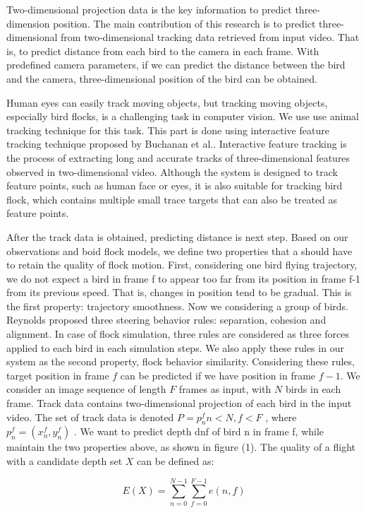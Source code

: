 Two-dimensional projection data is the key information to predict three-dimension position. The main contribution of this research is to predict three-dimensional from two-dimensional tracking data retrieved from input video. That is, to predict distance from each bird to the camera in each frame. With predefined camera parameters, if we can predict the distance between the bird and the camera, three-dimensional position of the bird can be obtained.


Human eyes can easily track moving objects, but tracking moving objects, especially bird flocks, is a challenging task in computer vision. We use use animal tracking technique for this task. This part is done using interactive feature tracking technique proposed by Buchanan et al.\cite{Tracking}. Interactive feature tracking is the process of extracting long and accurate tracks of three-dimensional features observed in two-dimensional video. Although the system is designed to track feature points, such as human face or eyes, it is also suitable for tracking bird flock, which contains multiple small trace targets that can also be treated as feature points.


After the track data is obtained, predicting distance is next step. Based on our observations and boid flock models, we define two properties that a should have to retain the quality of flock motion. First, considering one bird flying trajectory, we do not expect a bird in frame f to appear too far from its position in frame f-1 from its previous speed. That is, changes in position tend to be gradual. This is the first property: trajectory smoothness. Now we considering a group of birds. Reynolds proposed three steering behavior rules: separation, cohesion and alignment\cite{Boid}. In case of flock simulation, three rules are considered as three forces applied to each bird in each simulation steps. We also apply these rules in our system as the second property, flock behavior similarity. Considering these rules, target position in frame $f$ can be predicted if we have position in frame $f-1$. We consider an image sequence of length $F$ frames as input, with $N$ birds in each frame. Track data contains two-dimensional projection of each bird in the input video. The set of track data is denoted $P={p_n^f}n<N,f<F$ , where $p_n^f=(x_n^f, y_n^f)$ . We want to predict depth dnf of bird n in frame f, while maintain the two properties above, as shown in figure (1). The quality of a flight with a candidate depth set $X$ can be defined as:


\begin{equation}\label{eq:1}
 E(X) = \sum_{n = 0}^{N-1} \sum_{f = 0}^{F-1}e(n,f)
\end{equation}


